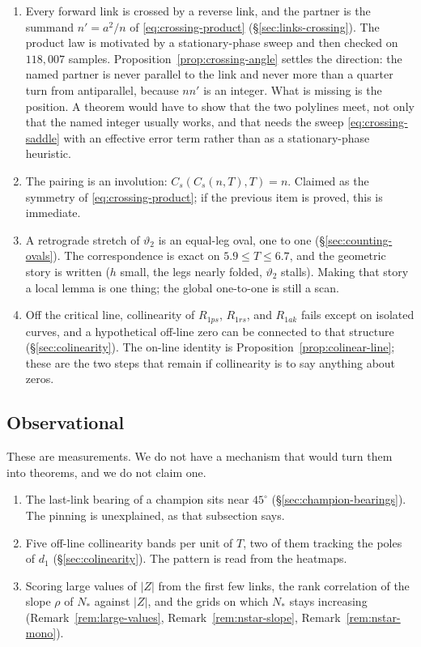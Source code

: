 \documentclass[11pt]{article}
\theoremstyle{definition}
\begin{document}
\begin{enumerate}
\item
Every forward link is crossed by a reverse link, and the partner is the
summand $n'=a^{2}/n$ of \eqref{eq:crossing-product}
(\S\ref{sec:links-crossing}).
The product law is motivated by a stationary-phase sweep and then
checked on $118{,}007$ samples.
Proposition~\ref{prop:crossing-angle} settles the direction: the named
partner is never parallel to the link and never more than a quarter turn
from antiparallel, because $nn'$ is an integer. What is missing is the
position. A theorem would have to show that the
two polylines meet, not only that the named integer usually works, and
that needs the sweep \eqref{eq:crossing-saddle} with an effective error
term rather than as a stationary-phase heuristic.

\item
The pairing is an involution: $C_{s}(C_{s}(n,T),T)=n$.
Claimed as the symmetry of \eqref{eq:crossing-product}; if the previous
item is proved, this is immediate.

\item
A retrograde stretch of $\vartheta_2$ is an equal-leg oval, one to one
(\S\ref{sec:counting-ovals}).
The correspondence is exact on $5.9\le T\le 6.7$, and the geometric
story is written ($h$ small, the legs nearly folded, $\vartheta_2$
stalls). Making that story a local lemma is one thing; the global
one-to-one is still a scan.

\item
Off the critical line, collinearity of $R_{1ps}$, $R_{1rs}$, and
$R_{1ak}$ fails except on isolated curves, and a hypothetical off-line
zero can be connected to that structure
(\S\ref{sec:colinearity}).
The on-line identity is Proposition~\ref{prop:colinear-line}; these are
the two steps that remain if collinearity is to say anything about
zeros.
\end{enumerate}

\subsection*{Observational}

These are measurements. We do not have a mechanism that would turn them
into theorems, and we do not claim one.

\begin{enumerate}
\item
The last-link bearing of a champion sits near $45^{\circ}$
(\S\ref{sec:champion-bearings}).
The pinning is unexplained, as that subsection says.

\item
Five off-line collinearity bands per unit of $T$, two of them tracking
the poles of $d_1$
(\S\ref{sec:colinearity}).
The pattern is read from the heatmaps.

\item
Scoring large values of $|Z|$ from the first few links, the rank
correlation of the slope $\rho$ of $N_{\ast}$ against $|Z|$, and the
grids on which $N_{\ast}$ stays increasing
(Remark~\ref{rem:large-values}, Remark~\ref{rem:nstar-slope},
Remark~\ref{rem:nstar-mono}).
\end{enumerate}
\end{document}
